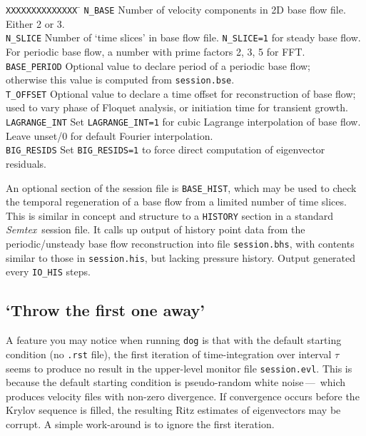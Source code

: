 \documentclass[11pt,a4paper]{report}
\newcommand{\Semtex}{\emph{Semtex}}
\begin{document}
\begin{tabbing}
\texttt{XXXXXXXXXXXXXX} \= \kill 
%
\texttt{N\_BASE}  \>
  Number of velocity components in 2D base flow file.  Either 2 or 3.\\
\texttt{N\_SLICE}  \>
  Number of `time slices' in base flow file. \verb+N_SLICE=1+ for 
  steady base flow.\\
  \> For periodic base flow, a number with prime factors 2, 3, 5 for FFT.\\
\texttt{BASE\_PERIOD}  \>
  Optional value to declare period of a periodic base flow;\\
  \>  otherwise this value is computed from \verb+session.bse+.\\
\texttt{T\_OFFSET}  \>
  Optional value to declare a time offset for reconstruction of base flow;\\
  \>  used to vary phase of Floquet analysis, or initiation time for
      transient growth.\\
\texttt{LAGRANGE\_INT} \>
  Set \verb+LAGRANGE_INT=1+ for cubic Lagrange interpolation of base flow.\\
  \> Leave unset/0 for default Fourier interpolation.\\
\texttt{BIG\_RESIDS} \>
  Set \verb+BIG_RESIDS=1+ to force direct computation of 
  eigenvector residuals.
\end{tabbing}

An optional section of the session file is \verb+BASE_HIST+, which may
be used to check the temporal regeneration of a base flow from a
limited number of time slices.  This is similar in concept and
structure to a \verb+HISTORY+ section in a standard \Semtex\ session
file. It calls up output of history point data from the
periodic/unsteady base flow reconstruction into file
\verb+session.bhs+, with contents similar to those in
\verb+session.his+, but lacking pressure history.  Output generated
every \verb+IO_HIS+ steps.

\subsection{`Throw the first one away'}

A feature you may notice when running \verb+dog+ is that with the
default starting condition (no \verb+.rst+ file), the first iteration
of time-integration over interval $\tau$ seems to produce no result in
the upper-level monitor file \verb+session.evl+.  This is because the
default starting condition is pseudo-random white noise\,---\, which
produces velocity files with non-zero divergence.  If convergence
occurs before the Krylov sequence is filled, the resulting Ritz
estimates of eigenvectors may be corrupt.  A simple work-around is to
ignore the first iteration.
\end{document}
